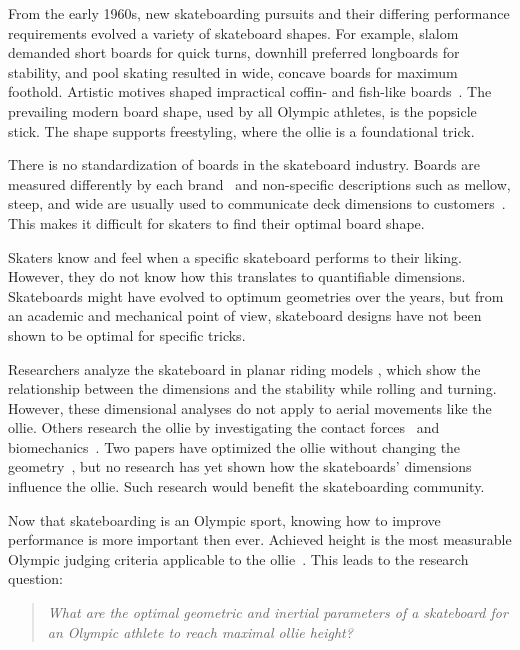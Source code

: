 \documentclass[default,iicol]{sn-jnl}
\begin{document}
From the early 1960s, new skateboarding pursuits and their differing performance requirements evolved a variety of skateboard shapes.
For example, slalom demanded short boards for quick turns, downhill preferred longboards for stability, and pool skating resulted in wide, concave boards for maximum foothold. 
Artistic motives shaped impractical coffin- and
fish-like boards~\cite{prentiss_get_2011}.
The prevailing modern board shape, used by all Olympic athletes, is the popsicle stick.
The shape supports freestyling, where the ollie is a foundational trick.

There is no standardization of boards in the skateboard industry.
Boards are measured differently by each brand~\cite{johnny_skateboarding_2013} and non-specific descriptions such as mellow, steep, and wide are usually used to communicate deck dimensions to customers~\cite{berger_handmade_2021}.
This makes it difficult for skaters to find their optimal board shape.

Skaters know and feel when a specific skateboard performs to their liking.
However, they do not know how this translates to quantifiable dimensions.
Skateboards might have evolved to optimum geometries over the years, but from an academic and mechanical point of view, skateboard designs have not been shown to be optimal for specific tricks.

Researchers analyze the skateboard in planar riding models
\cite{hubbard_lateral_1979,hubbard_human_1980,kremnev_nonlinear_2010,ispolov_skateboard_1996,rosatello_skateboard_2015,varszegi_stability_2017,varszegi_stabilizing_2016,varszegi_downhill_2016,varszegi_balancing_2014,kuleshov_mathematical_2007,kuleshov_various_2010}, which show the relationship between the dimensions and the stability while rolling and turning. 
However, these dimensional analyses do not apply to aerial movements like the ollie.
Others research the ollie by investigating the contact forces~\cite{anderson_ollie_2020,shield_contact-implicit_2022} and biomechanics~\cite{frederick_biomechanics_2006,vorlicek_analysis_2015,wood_3d_2020,nakashima_simulation_2021,nevitt_ground_2006,candotti_lower_2012,dias_using_2016,anderson_ollie_2020,bridgman_human_1992,ou_postural_2021}.
Two papers have optimized the ollie without changing the geometry~\cite{anderson_ollie_2020,shield_contact-implicit_2022}, but no research has yet shown how the skateboards' dimensions influence the ollie.
Such research would benefit the skateboarding community.

Now that skateboarding is an Olympic sport, knowing how to improve performance is more important then ever.
Achieved height is the most measurable Olympic judging criteria applicable to the ollie~\cite{world_skate_skateboarding_2021}.
This leads to the research question:
\begin{quote}
\textit{
    What are the optimal geometric and inertial parameters of a skateboard for an Olympic athlete to reach maximal ollie height?}
\end{quote}
\end{document}
